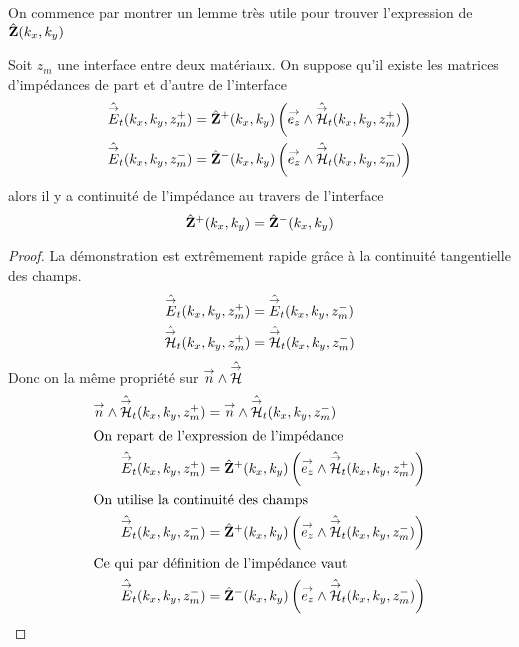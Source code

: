         On commence par montrer un lemme très utile pour trouver l'expression de \(\hat {\mathbf{Z}}(k_x,k_y)\)
        \begin{lemme}
          \label{lem:plan:continuite_impedance}
          Soit \(z_m\) une interface entre deux matériaux. On suppose qu'il existe les matrices d'impédances de part et d'autre de l'interface
          \begin{align*}
              \hat{{\overset{\rightarrow}{E}}}_t(k_x,k_y,z_m^+) &= \hat{\mathbf{Z}}^+(k_x,k_y) \left({\overset{\rightarrow}{e_z}} \wedge \hat{{\overset{\rightarrow}{\mathcal{H}}}}_t(k_x,k_y,z_m^+)\right)
              \\
              \hat{{\overset{\rightarrow}{E}}}_t(k_x,k_y,z_m^-) &= \hat{\mathbf{Z}}^-(k_x,k_y) \left({\overset{\rightarrow}{e_z}} \wedge \hat{{\overset{\rightarrow}{\mathcal{H}}}}_t(k_x,k_y,z_m^-)\right)
          \end{align*}
          alors il y a continuité de l'impédance au travers de l'interface
          \begin{equation*}
          \hat {\mathbf{Z}}^+(k_x,k_y) = \hat {\mathbf{Z}}^-(k_x,k_y)
          \end{equation*}
        \end{lemme}
        \begin{proof}
          La démonstration est extrêmement rapide grâce à la continuité tangentielle des champs.
          \begin{align*}
            \hat{{\overset{\rightarrow}{E}}}_t(k_x,k_y,z_m^+) &= \hat{{\overset{\rightarrow}{E}}}_t(k_x,k_y,z_m^-)
            \\
            \hat{{\overset{\rightarrow}{\mathcal{H}}}}_t(k_x,k_y,z_m^+) &= \hat{{\overset{\rightarrow}{\mathcal{H}}}}_t(k_x,k_y,z_m^-)
          \end{align*}
          Donc on la même propriété sur \({\overset{\rightarrow}{n}} \wedge \hat{{\overset{\rightarrow}{\mathcal{H}}}}\)
          \begin{align*}                
            {\overset{\rightarrow}{n}} \wedge \hat{{\overset{\rightarrow}{\mathcal{H}}}}_t(k_x,k_y,z_m^+) &= {\overset{\rightarrow}{n}} \wedge \hat{{\overset{\rightarrow}{\mathcal{H}}}}_t(k_x,k_y,z_m^-)
            \\
            \intertext{On repart de l'expression de l'impédance}
            \hat{{\overset{\rightarrow}{E}}}_t(k_x,k_y,z_m^+) &= \hat{\mathbf{Z}}^+(k_x,k_y) \left({\overset{\rightarrow}{e_z}} \wedge \hat{{\overset{\rightarrow}{\mathcal{H}}}}_t(k_x,k_y,z_m^+)\right)
            \\
            \intertext{On utilise la continuité des champs}
            \hat{{\overset{\rightarrow}{E}}}_t(k_x,k_y,z_m^-) &= \hat{\mathbf{Z}}^+(k_x,k_y) \left({\overset{\rightarrow}{e_z}} \wedge \hat{{\overset{\rightarrow}{\mathcal{H}}}}_t(k_x,k_y,z_m^-)\right)
            \\
            \intertext{Ce qui par définition de l'impédance vaut}
            \hat{{\overset{\rightarrow}{E}}}_t(k_x,k_y,z_m^-) &= \hat{\mathbf{Z}}^-(k_x,k_y) \left({\overset{\rightarrow}{e_z}} \wedge \hat{{\overset{\rightarrow}{\mathcal{H}}}}_t(k_x,k_y,z_m^-)\right)
          \end{align*}
        \end{proof}

